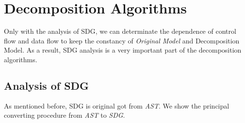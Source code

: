\section{Decomposition Algorithms}
Only with the analysis of SDG, we can determinate the dependence of control flow and data flow to keep the constancy of \emph{Original Model} and {Decomposition Model}. As a result, SDG analysis is a very important part of the decomposition algorithms.

\subsection{Analysis of SDG}
As mentioned before, SDG is original got from  \emph{AST}. We show the principal converting procedure from  \emph{AST} to \emph{SDG}.
%
%
%
%

